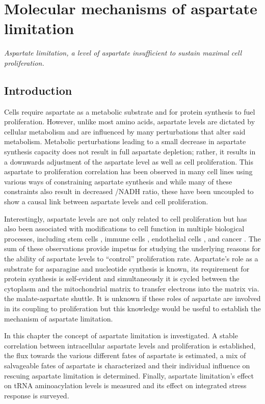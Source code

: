 \chapter{Molecular mechanisms of aspartate limitation}
\label{chap2}
\textit{Aspartate limitation, a level of aspartate insufficient to sustain maximal cell proliferation.}


\section{Introduction}
Cells require aspartate as a metabolic substrate and for protein synthesis to fuel proliferation.
However, unlike most amino acids, aspartate levels are dictated by cellular metabolism and are influenced by many perturbations that alter said metabolism.
Metabolic perturbations leading to a small decrease in aspartate synthesis capacity does not result in full aspartate depletion; rather, it results in a downwards adjustment of the aspartate level as well as cell proliferation.
This aspartate to proliferation correlation has been observed in many cell lines using various ways of constraining aspartate synthesis and while many of these constraints also result in decreased \NAD{}/NADH ratio, these have been uncoupled to show a causal link between aspartate levels and cell proliferation.

Interestingly, aspartate levels are not only related to cell proliferation but has also been associated with modifications to cell function in multiple biological processes, including stem cells \cite{Tournaire2022-ut, Arnold2022-ft}, immune cells \cite{Bailis2019-mf}, endothelial cells \cite{Diebold2019-hh}, and cancer \cite{Helenius2021-ht}.
The sum of these observations provide impetus for studying the underlying reasons for the ability of aspartate levels to ``control'' proliferation rate.
Aspartate's role as a substrate for asparagine and nucleotide synthesis is known, its requirement for protein synthesis is self-evident and simultaneously it is cycled between the cytoplasm and the mitochondrial matrix to transfer electrons into the matrix via. the malate-aspartate shuttle.
It is unknown if these roles of aspartate are involved in its coupling to proliferation but this knowledge would be useful to establish the mechanism of aspartate limitation.

In this chapter the concept of aspartate limitation is investigated.
A stable correlation between intracellular aspartate levels and proliferation is established, the flux towards the various different fates of aspartate is estimated, a mix of salvageable fates of aspartate is characterized and their individual influence on rescuing aspartate limitation is determined.
Finally, aspartate limitation's effect on tRNA aminoacylation levels is measured and its effect on integrated stress response is surveyed.




